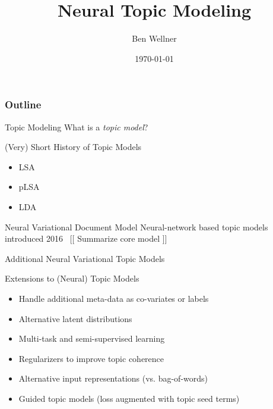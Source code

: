 \documentclass{beamer}
\title{Neural Topic Modeling}
\author{Ben Wellner}
\institute{MITRE}
\date{\today}
\begin{document}
\begin{frame}
\frametitle{Outline}
\tableofcontents
\end{frame}

\begin{frame}{Topic Modeling}
  What is a \emph{topic model}?
  
\end{frame}

\begin{frame}{(Very) Short History of Topic Models}
  \begin{itemize}
  \item LSA
  \item pLSA
  \item LDA
  \end{itemize}
  
\end{frame}

\begin{frame}{Neural Variational Document Model}
  Neural-network based topic models introduced 2016~\cite{pmlr-v48-miao16}
  [[ Summarize core model ]]
\end{frame}

\begin{frame}{Additional Neural Variational Topic Models}
\end{frame}

\begin{frame}{Extensions to (Neural) Topic Models}
  \begin{itemize}
  \item Handle additional meta-data as co-variates or labels
  \item Alternative latent distributions
  \item Multi-task and semi-supervised learning 
  \item Regularizers to improve topic coherence
  \item Alternative input representations (vs. bag-of-words)
  \item Guided topic models (loss augmented with topic seed terms)
  \end{itemize}
\end{frame}
\end{document}
